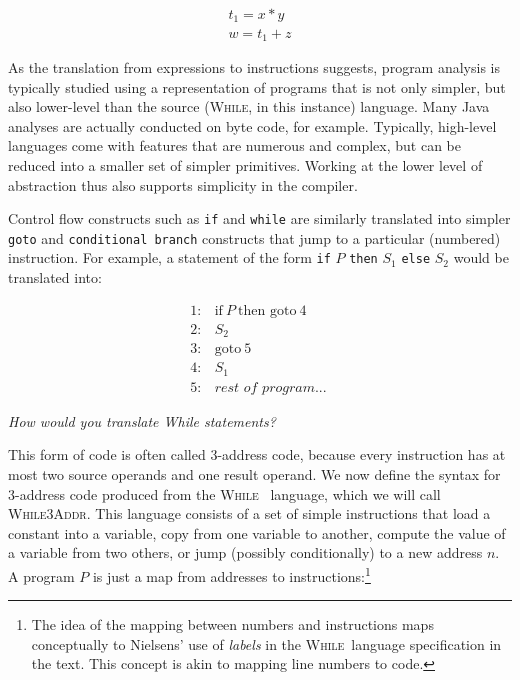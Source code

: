 \documentclass[11pt]{article}
\def\While{\textsc{While}}
\def\WhileThAddr{\textsc{While3Addr}}
\begin{document}
\[
\begin{array}{l}
t_1 = x * y \\
w = t_1 + z
\end{array}
\]

As the translation from expressions to instructions suggests, program analysis
is typically studied using a representation of programs that is not only
simpler, but also lower-level than the source (\While, in this instance)
language.  Many Java analyses are actually conducted on byte code, for example.
Typically, high-level languages come with features that are numerous and
complex, but can be reduced into a smaller set of simpler primitives.  Working
at the lower level of abstraction thus also supports simplicity in the compiler.

Control flow constructs such as \texttt{if} and \texttt{while} are similarly translated into
simpler \texttt{goto} and \texttt{conditional branch} constructs that jump to a particular
(numbered) instruction.  For example, a statement of the form \texttt{if} $P$ \texttt{then} $S_1$
\texttt{else} $S_2$ would be translated into:

\[
\begin{array}{ll}
1: & \mbox{if}~P~\mbox{then goto}~4\\
2: & S_2\\
3: & \mbox{goto}~5\\
4: & S_1\\
5: & \textit{rest of program...}\
\end{array}
\]

\noindent \emph{How would you translate While statements?} 

%

\vspace{1em}

This form of code is often called 3-address code, because every instruction
has at most two source operands and one result operand.  
%
We now define the syntax for 3-address code produced from the \While~
language, which we will call \WhileThAddr.  This language consists of a
set of simple instructions that load a constant into a variable, copy from one
variable to another, compute the value of a variable from two others, or jump
(possibly conditionally) to a new address $n$.  A program $P$ is just a map from
addresses to instructions:\footnote{The idea of the mapping between numbers and instructions maps
conceptually to Nielsens' use of \emph{labels} in the \While~language
specification in the text.  This concept is akin to mapping line numbers to code.}
\end{document}
